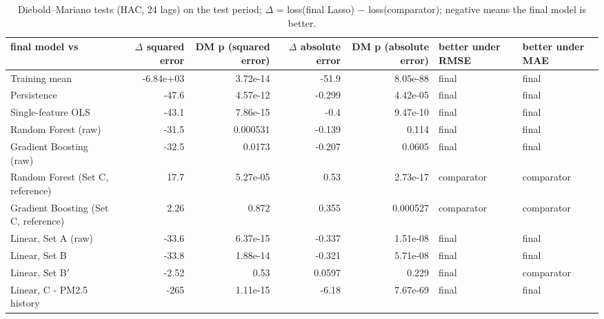 \begin{table}[t]
\centering
\small
\caption{Diebold--Mariano tests (HAC, 24 lags) on the test period; $\Delta$ = loss(final Lasso) $-$ loss(comparator); negative means the final model is better.}
\label{tab:table_S11_diebold_mariano}
\begin{tabular}{lrrrrll}
\toprule
final model vs & $\Delta$ squared error & DM p (squared error) & $\Delta$ absolute error & DM p (absolute error) & better under RMSE & better under MAE \\
\midrule
Training mean & -6.84e+03 & 3.72e-14 & -51.9 & 8.05e-88 & final & final \\
Persistence & -47.6 & 4.57e-12 & -0.299 & 4.42e-05 & final & final \\
Single-feature OLS & -43.1 & 7.86e-15 & -0.4 & 9.47e-10 & final & final \\
Random Forest (raw) & -31.5 & 0.000531 & -0.139 & 0.114 & final & final \\
Gradient Boosting (raw) & -32.5 & 0.0173 & -0.207 & 0.0605 & final & final \\
Random Forest (Set C, reference) & 17.7 & 5.27e-05 & 0.53 & 2.73e-17 & comparator & comparator \\
Gradient Boosting (Set C, reference) & 2.26 & 0.872 & 0.355 & 0.000527 & comparator & comparator \\
Linear, Set A (raw) & -33.6 & 6.37e-15 & -0.337 & 1.51e-08 & final & final \\
Linear, Set B & -33.8 & 1.88e-14 & -0.321 & 5.71e-08 & final & final \\
Linear, Set B$'$ & -2.52 & 0.53 & 0.0597 & 0.229 & final & comparator \\
Linear, C - PM2.5 history & -265 & 1.11e-15 & -6.18 & 7.67e-69 & final & final \\
\bottomrule
\end{tabular}
\end{table}
